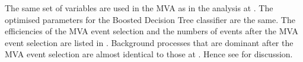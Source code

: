 The same set of variables are used in the MVA as in the analysis at . The optimised parameters for the Boosted Decision Tree classifier are the same. The efficiencies of the MVA event selection and the numbers of events after the MVA event selection are listed in . Background processes that are dominant after the MVA event selection are almost identical to those at . Hence see  for discussion.

